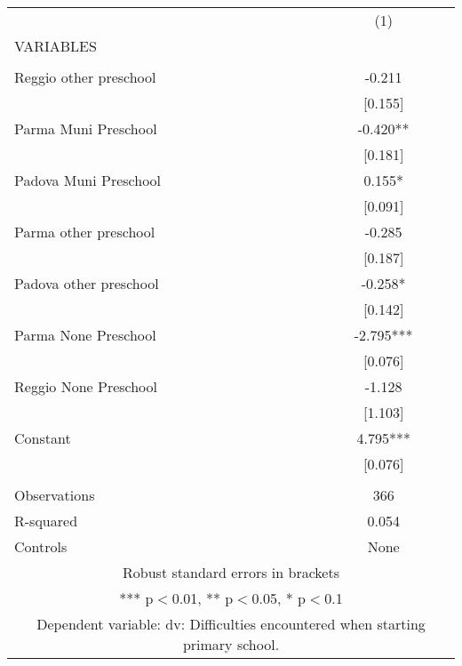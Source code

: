 \begin{tabular}{lc} \hline
 & (1) \\
VARIABLES &  \\ \hline
 &  \\
Reggio other preschool & -0.211 \\
 & [0.155] \\
Parma Muni Preschool & -0.420** \\
 & [0.181] \\
Padova Muni Preschool & 0.155* \\
 & [0.091] \\
Parma other preschool & -0.285 \\
 & [0.187] \\
Padova other preschool & -0.258* \\
 & [0.142] \\
Parma None Preschool & -2.795*** \\
 & [0.076] \\
Reggio None Preschool & -1.128 \\
 & [1.103] \\
Constant & 4.795*** \\
 & [0.076] \\
 &  \\
Observations & 366 \\
R-squared & 0.054 \\
 Controls & None \\ \hline
\multicolumn{2}{c}{ Robust standard errors in brackets} \\
\multicolumn{2}{c}{ *** p$<$0.01, ** p$<$0.05, * p$<$0.1} \\
\multicolumn{2}{c}{ Dependent variable: dv: Difficulties encountered when starting primary school.} \\
\end{tabular}
